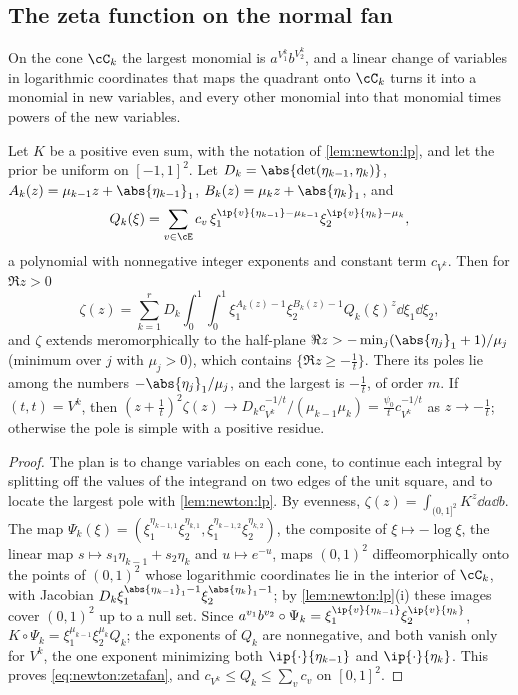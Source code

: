 \begin{refsection}
\subsection{The zeta function on the normal fan}

On the cone $\cC_k$ the largest monomial is $a^{V^k_1}b^{V^k_2}$, and a linear change of variables in logarithmic coordinates that maps the quadrant onto $\cC_k$ turns it into a monomial in new variables, and every other monomial into that monomial times powers of the new variables.

\begin{proposition}\label{prop:newton:zeta}
Let $K$ be a positive even sum, with the notation of \cref{lem:newton:lp}, and let the prior be uniform on $[-1,1]^2$. Let $D_k=\abs{\det(\eta_{k-1},\eta_k)}$, $A_k(z)=\mu_{k-1}z+\abs{\eta_{k-1}}_1$, $B_k(z)=\mu_kz+\abs{\eta_k}_1$, and
\[
Q_k(\xi)=\sum_{v\in\cE}c_v\,\xi_1^{\ip{v}{\eta_{k-1}}-\mu_{k-1}}\xi_2^{\ip{v}{\eta_k}-\mu_k},
\]
a polynomial with nonnegative integer exponents and constant term $c_{V^k}$. Then for $\Re z>0$
\begin{equation}\label{eq:newton:zetafan}
\zeta(z)=\sum_{k=1}^rD_k\int_0^1\!\!\int_0^1\xi_1^{A_k(z)-1}\xi_2^{B_k(z)-1}Q_k(\xi)^z\dd\xi_1\dd\xi_2,
\end{equation}
and $\zeta$ extends meromorphically to the half-plane $\Re z>-\min_j(\abs{\eta_j}_1+1)/\mu_j$ (minimum over $j$ with $\mu_j>0$), which contains $\{\Re z\ge-\frac1t\}$. There its poles lie among the numbers $-\abs{\eta_j}_1/\mu_j$, and the largest is $-\frac1t$, of order $m$. If $(t,t)=V^k$, then $(z+\frac1t)^2\zeta(z)\to D_kc_{V^k}^{-1/t}/(\mu_{k-1}\mu_k)=\frac{\psi_0}tc_{V^k}^{-1/t}$ as $z\to-\frac1t$; otherwise the pole is simple with a positive residue.
\end{proposition}

\begin{proof}
The plan is to change variables on each cone, to continue each integral by splitting off the values of the integrand on two edges of the unit square, and to locate the largest pole with \cref{lem:newton:lp}. By evenness, $\zeta(z)=\int_{(0,1]^2}K^z\dd a\dd b$. The map $\Psi_k(\xi)=(\xi_1^{\eta_{k-1,1}}\xi_2^{\eta_{k,1}},\xi_1^{\eta_{k-1,2}}\xi_2^{\eta_{k,2}})$, the composite of $\xi\mapsto-\log\xi$, the linear map $s\mapsto s_1\eta_{k-1}+s_2\eta_k$ and $u\mapsto e^{-u}$, maps $(0,1)^2$ diffeomorphically onto the points of $(0,1)^2$ whose logarithmic coordinates lie in the interior of $\cC_k$, with Jacobian $D_k\xi_1^{\abs{\eta_{k-1}}_1-1}\xi_2^{\abs{\eta_k}_1-1}$; by \cref{lem:newton:lp}(i) these images cover $(0,1)^2$ up to a null set. Since $a^{v_1}b^{v_2}\circ\Psi_k=\xi_1^{\ip{v}{\eta_{k-1}}}\xi_2^{\ip{v}{\eta_k}}$, $K\circ\Psi_k=\xi_1^{\mu_{k-1}}\xi_2^{\mu_k}Q_k$; the exponents of $Q_k$ are nonnegative, and both vanish only for $V^k$, the one exponent minimizing both $\ip{\cdot}{\eta_{k-1}}$ and $\ip{\cdot}{\eta_k}$. This proves \eqref{eq:newton:zetafan}, and $c_{V^k}\le Q_k\le\sum_vc_v$ on $[0,1]^2$.


\end{proof}
\end{refsection}
